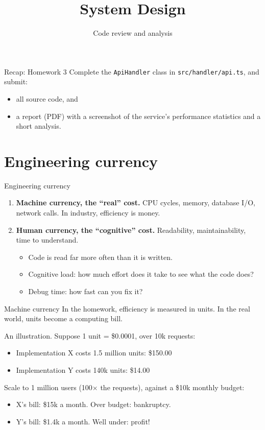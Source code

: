 \documentclass[aspectratio=169]{beamer}
\title{System Design}
\subtitle{Code review and analysis}
\begin{document}
\maketitle

\begin{frame}{Recap: Homework 3}
  Complete the \texttt{ApiHandler} class in \texttt{src/handler/api.ts}, and submit:
  \begin{itemize}
    \item all source code, and
    \item a report (PDF) with a screenshot of the service's performance statistics and a
      short analysis.
  \end{itemize}
\end{frame}

\section{Engineering currency}

\begin{frame}{Engineering currency}
  \begin{enumerate}
    \item \textbf{Machine currency, the ``real'' cost.}
      CPU cycles, memory, database I/O, network calls.
      In industry, efficiency is money.
    \item \textbf{Human currency, the ``cognitive'' cost.}
      Readability, maintainability, time to understand.
      \begin{itemize}
        \item Code is read far more often than it is written.
        \item Cognitive load: how much effort does it take to see what the code does?
        \item Debug time: how fast can you fix it?
      \end{itemize}
  \end{enumerate}
\end{frame}

\begin{frame}{Machine currency}
  In the homework, efficiency is measured in \alert{units}. In the real world, units become
  a computing bill.

  \medskip
  An illustration. Suppose 1 unit = \$0.0001, over 10k requests:
  \begin{itemize}
    \item Implementation X costs 1.5 million units: \$150.00
    \item Implementation Y costs 140k units: \$14.00
  \end{itemize}
  \pause
  Scale to 1 million users (100$\times$ the requests), against a \$10k monthly budget:
  \begin{itemize}
    \item X's bill: \$15k a month. Over budget: \alert{bankruptcy.}
    \item Y's bill: \$1.4k a month. Well under: \alert{profit!}
  \end{itemize}
\end{frame}
\end{document}
